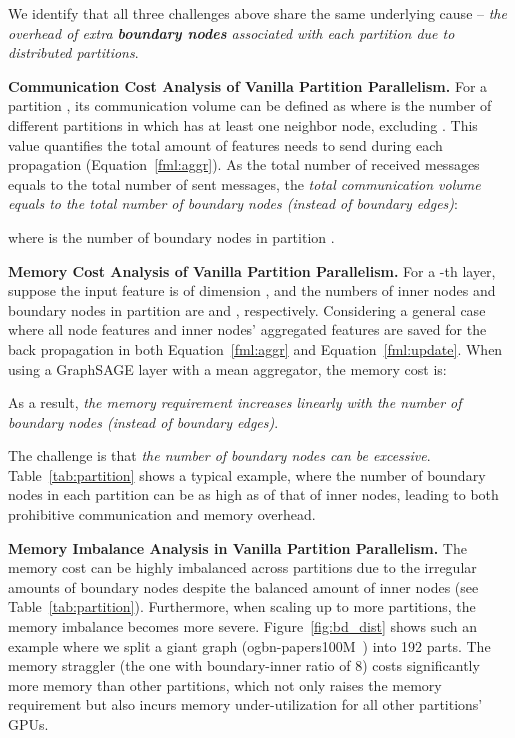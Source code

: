 \documentclass{article}
\newcommand{\niparagraph}[1]{\noindent\textbf{#1}}
\begin{document}
We identify that all three challenges above share the same underlying cause -- \textit{the overhead of extra \textbf{boundary nodes} associated with each partition due to distributed partitions}.


    
    




\niparagraph{Communication Cost Analysis of Vanilla Partition Parallelism.}
For a partition , its communication volume can be defined as  where  is the number of different partitions in which  has at least one neighbor node, excluding  \citep{bulucc2016recent}. 
This value quantifies the total amount of features  needs to send during each propagation (Equation~\ref{fml:aggr}). 
As the total number of received messages equals to the total number of sent messages, the \textit{total communication volume equals to the total number of boundary nodes (instead of boundary edges)}:

where  is the number of boundary nodes in partition .

\niparagraph{Memory Cost Analysis of Vanilla Partition Parallelism.}
For a -th layer, suppose the input feature is of dimension , and the numbers of inner nodes and boundary nodes in partition  are  and , respectively.
Considering a general case where all node features and inner nodes' aggregated features are saved for the back propagation in both Equation~\ref{fml:aggr} and Equation~\ref{fml:update}. 
When using a GraphSAGE layer with a mean aggregator, the memory cost is:

As a result, \textit{the memory requirement increases linearly with the number of boundary nodes (instead of boundary edges)}.

The challenge is that \textit{the number of boundary nodes can be excessive}.
Table~\ref{tab:partition} shows a typical example, where
the number of boundary nodes in each partition can be as high as  of that of inner nodes, leading to both prohibitive communication and memory overhead. 

\niparagraph{Memory Imbalance Analysis in Vanilla Partition Parallelism.}
The memory cost can be highly imbalanced across partitions due to the irregular amounts of boundary nodes despite the balanced amount of inner nodes (see Table~\ref{tab:partition}). 
Furthermore, when scaling up to more partitions, the memory imbalance becomes more severe.
Figure~\ref{fig:bd_dist} shows such an example where we split a giant graph (ogbn-papers100M~\citep{hu2020open}) into 192 parts. 
The memory straggler (the one with boundary-inner ratio of 8) costs significantly more memory than other partitions, which not only raises the memory requirement but also incurs memory under-utilization for all other partitions' GPUs.
\end{document}
